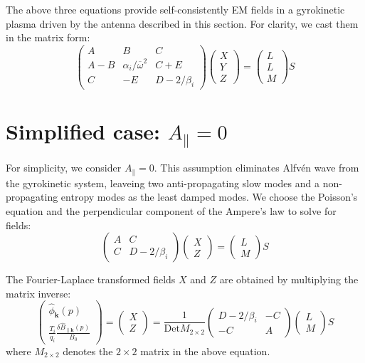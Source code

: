 \documentclass[12pt]{article}
\begin{document}
The above three equations provide self-consistently EM fields in a gyrokinetic plasma driven by the antenna described in this section. For clarity, we cast them in the matrix form:
%
\begin{equation}
\begin{pmatrix}
A & B & C \\
A-B & \alpha_i/\overline{\omega}^2 & C + E \\
C & -E & D- 2/\beta_i 
\end{pmatrix}
\begin{pmatrix}
 X\\
 Y\\
 Z
\end{pmatrix}
=
\begin{pmatrix}
L\\
L\\
M
\end{pmatrix} S
\label{eq:driving_eq_mat_form}
\end{equation}

\section{Simplified case: $A_\parallel = 0$}
For simplicity, we consider $A_\parallel = 0$. This assumption eliminates Alfv{\'e}n wave from the gyrokinetic system, leaveing two anti-propagating slow modes and a non-propagating entropy modes as the least damped modes.  We choose the Poisson's equation and the perpendicular component of the Ampere's law to solve for fields:
%
\begin{equation}
\begin{pmatrix}
A & C\\
C & D-2/\beta_i 
\end{pmatrix}
\begin{pmatrix}
X \\
Z
\end{pmatrix}
=
\begin{pmatrix}
L \\
M
\end{pmatrix}
S
\end{equation}

The Fourier-Laplace transformed fields $X$ and $Z$ are obtained by multiplying the matrix inverse:
%
\begin{equation}
\begin{pmatrix}
\hat{\phi} _{\mathbf{k}}(p)\\
\frac{T_i}{q_i} \frac{\delta \hat{B}_{\parallel \mathbf{k}}(p)}{B_0} 
\end{pmatrix}
=
\begin{pmatrix}
X \\
Z
\end{pmatrix}
=\frac{1}{\mathrm{Det}M_{2\times2}}
\begin{pmatrix}
D-2/\beta_i  & -C\\
-C & A
\end{pmatrix}
\begin{pmatrix}
L\\
M
\end{pmatrix}
S
\end{equation}
where $M_{2\times2}$ denotes the $2\times2$ matrix in the above equation.
\end{document}

